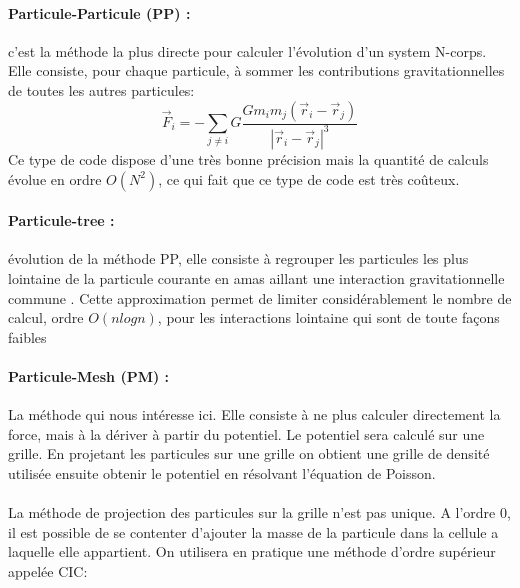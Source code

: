 \paragraph{Particule-Particule (PP) : } c'est la méthode la plus directe pour calculer l'évolution d'un system N-corps. 
Elle consiste, pour chaque particule, à sommer les contributions gravitationnelles de toutes les autres particules:
\begin{equation}
\vec{F}_i=-\sum_{j\neq i} G \frac{G m_i m_j(\vec{r}_i - \vec{r}_j) }{ |\vec{r}_i - \vec{r}_j |^3}
\end{equation}
Ce type de code dispose d'une très bonne précision mais la quantité de calculs évolue en ordre $O(N^2)$, ce qui fait que ce type de code est très coûteux.

\paragraph{Particule-tree : } évolution de la méthode PP, elle consiste à regrouper les particules les plus lointaine de la particule courante en amas aillant une interaction gravitationnelle commune \citep{1986Natur.324..446B}.
Cette approximation permet de limiter considérablement le nombre de calcul, ordre $O(n log n)$, pour les interactions lointaine qui sont de toute façons faibles 



%


\paragraph{Particule-Mesh (PM) : } La méthode qui nous intéresse ici.
Elle consiste à ne plus calculer directement la force, mais à la dériver à partir du potentiel.
Le potentiel sera calculé sur une grille.
En projetant les particules sur une grille on obtient une grille de densité utilisée ensuite obtenir le potentiel en résolvant l'équation de Poisson.

\paragraph{}
La méthode de projection des particules sur la grille n'est pas unique.
A l'ordre $0$, il est possible de se contenter d'ajouter la masse de la particule dans la cellule a laquelle elle appartient.
On utilisera en pratique une méthode d'ordre supérieur appelée \ac{CIC}:

